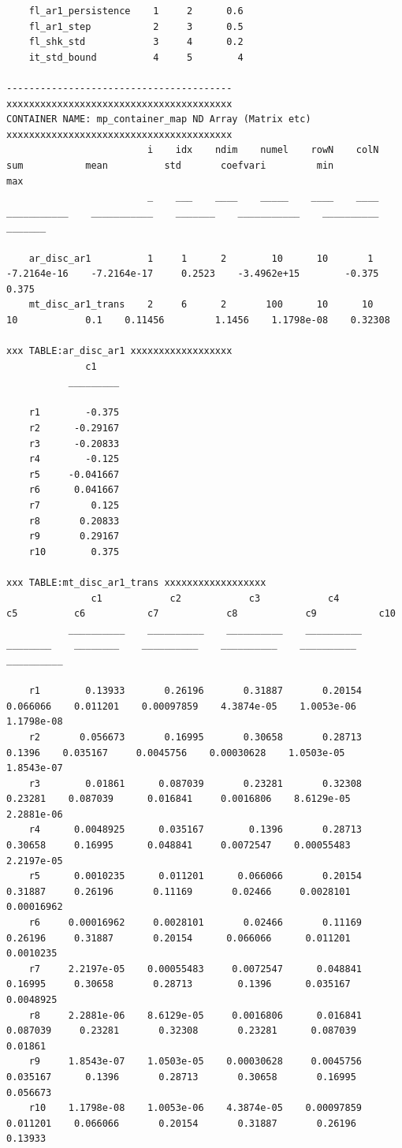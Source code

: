 \documentclass[
]{book}
\begin{document}
\begin{verbatim}
    fl_ar1_persistence    1     2      0.6 
    fl_ar1_step           2     3      0.5 
    fl_shk_std            3     4      0.2 
    it_std_bound          4     5        4 

----------------------------------------
xxxxxxxxxxxxxxxxxxxxxxxxxxxxxxxxxxxxxxxx
CONTAINER NAME: mp_container_map ND Array (Matrix etc)
xxxxxxxxxxxxxxxxxxxxxxxxxxxxxxxxxxxxxxxx
                         i    idx    ndim    numel    rowN    colN        sum           mean          std       coefvari         min          max  
                         _    ___    ____    _____    ____    ____    ___________    ___________    _______    ___________    __________    _______

    ar_disc_ar1          1     1      2        10      10       1     -7.2164e-16    -7.2164e-17     0.2523    -3.4962e+15        -0.375      0.375
    mt_disc_ar1_trans    2     6      2       100      10      10              10            0.1    0.11456         1.1456    1.1798e-08    0.32308

xxx TABLE:ar_disc_ar1 xxxxxxxxxxxxxxxxxx
              c1    
           _________

    r1        -0.375
    r2      -0.29167
    r3      -0.20833
    r4        -0.125
    r5     -0.041667
    r6      0.041667
    r7         0.125
    r8       0.20833
    r9       0.29167
    r10        0.375

xxx TABLE:mt_disc_ar1_trans xxxxxxxxxxxxxxxxxx
               c1            c2            c3            c4           c5          c6           c7            c8            c9           c10    
           __________    __________    __________    __________    ________    ________    __________    __________    __________    __________

    r1        0.13933       0.26196       0.31887       0.20154    0.066066    0.011201    0.00097859    4.3874e-05    1.0053e-06    1.1798e-08
    r2       0.056673       0.16995       0.30658       0.28713      0.1396    0.035167     0.0045756    0.00030628    1.0503e-05    1.8543e-07
    r3        0.01861      0.087039       0.23281       0.32308     0.23281    0.087039      0.016841     0.0016806    8.6129e-05    2.2881e-06
    r4      0.0048925      0.035167        0.1396       0.28713     0.30658     0.16995      0.048841     0.0072547    0.00055483    2.2197e-05
    r5      0.0010235      0.011201      0.066066       0.20154     0.31887     0.26196       0.11169       0.02466     0.0028101    0.00016962
    r6     0.00016962     0.0028101       0.02466       0.11169     0.26196     0.31887       0.20154      0.066066      0.011201     0.0010235
    r7     2.2197e-05    0.00055483     0.0072547      0.048841     0.16995     0.30658       0.28713        0.1396      0.035167     0.0048925
    r8     2.2881e-06    8.6129e-05     0.0016806      0.016841    0.087039     0.23281       0.32308       0.23281      0.087039       0.01861
    r9     1.8543e-07    1.0503e-05    0.00030628     0.0045756    0.035167      0.1396       0.28713       0.30658       0.16995      0.056673
    r10    1.1798e-08    1.0053e-06    4.3874e-05    0.00097859    0.011201    0.066066       0.20154       0.31887       0.26196       0.13933


\end{verbatim}
\end{document}
